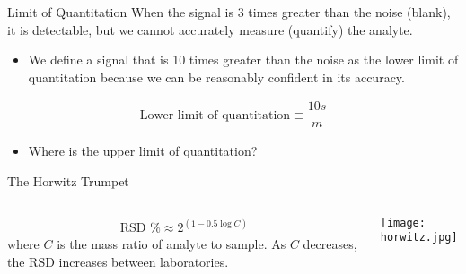 \documentclass[handout]{beamer}
\begin{document}
\begin{frame}{Limit of Quantitation}
		When the signal is 3 times greater than the noise (blank),
			it is detectable, but we cannot accurately measure
			(quantify) the analyte.
	\begin{itemize}
		\item We define a signal that is 10 times greater than the noise
			as the \alert{lower limit of quantitation} because we
			can be \alert{reasonably} confident in its accuracy.
	\end{itemize}

	\begin{align*}
		\text{Lower limit of quantitation} \equiv \dfrac{10s}{m}
	\end{align*}

	\begin{itemize}
		\item Where is the upper limit of quantitation?
	\end{itemize}
\end{frame}


\begin{frame}{The Horwitz Trumpet}
	\begin{columns}
		\begin{align*}
			\text{RSD \%} \approx 2^{(1-0.5 \log C)}
		\end{align*}
		where $C$ is the mass ratio of analyte to sample. As $C$
		decreases, the RSD increases between laboratories.
		\begin{center}
			\texttt{[image: horwitz.jpg]}
		\end{center}
	\end{columns}
\end{frame}
\end{document}
